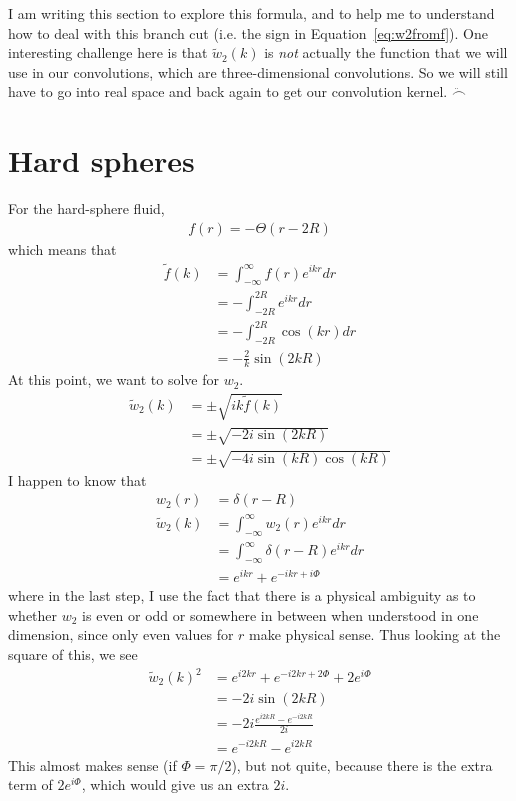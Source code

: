 \documentclass[letterpaper,twocolumn,amsmath,amssymb,prb]{revtex4-1}
\begin{document}
I am writing this section to explore this formula, and to help me to
understand how to deal with this branch cut (i.e. the sign in
Equation~\ref{eq:w2fromf}).  One interesting challenge here is that
$\tilde{w}_2(k)$ is \emph{not} actually the function that we will use
in our convolutions, which are three-dimensional convolutions.  So we
will still have to go into real space and back again to get our
convolution kernel.  $\ddot\frown$

\section{Hard spheres}

For the hard-sphere fluid,
\begin{align}
  f(r) = - \Theta(r - 2R)
\end{align}
which means that
\begin{align}
  \tilde{f}(k) &= \int_{-\infty}^\infty f(r) e^{ikr} dr \\
  &= -\int_{-2R}^{2R} e^{ikr} dr \\
  &= -\int_{-2R}^{2R} \cos(kr) dr \\
  &= -\frac{2}{k}\sin(2kR)
\end{align}
At this point, we want to solve for $w_2$.
\begin{align}
  \tilde{w}_2(k) &= \pm \sqrt{ik\tilde{f}(k)} \\
  &= \pm \sqrt{-2i\sin(2kR)} \\
  &= \pm \sqrt{-4i\sin(kR)\cos(kR)}
\end{align}
I happen to know that
\begin{align}
  w_2(r) &= \delta(r - R) \\
  \tilde{w}_2(k) &= \int_{-\infty}^\infty w_2(r) e^{ikr} dr \\
  &= \int_{-\infty}^\infty \delta(r-R) e^{ikr} dr \\
  &= e^{ikr} + e^{-ikr + i\Phi}
\end{align}
where in the last step, I use the fact that there is a physical
ambiguity as to whether $w_2$ is even or odd or somewhere in between
when understood in one dimension, since only even values for $r$ make
physical sense.  Thus looking at the square of this, we see
\begin{align}
  \tilde{w}_2(k)^2 &= e^{i2kr} + e^{-i2kr + 2\Phi} + 2e^{i\Phi} \\
  &= -2i\sin(2kR) \\
  &= -2i\frac{e^{i2kR} - e^{-i2kR}}{2i} \\
  &= e^{-i2kR} - e^{i2kR}
\end{align}
This almost makes sense (if $\Phi = \pi/2$), but not quite, because
there is the extra term of $2e^{i\Phi}$, which would give us an extra
$2i$.
\end{document}
